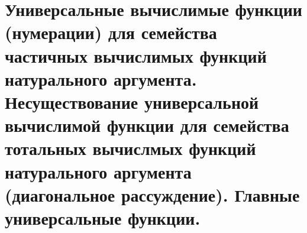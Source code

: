 \section{Универсальные вычислимые функции (нумерации) для семейства частичных вычислимых функций натурального аргумента. Несуществование универсальной вычислимой функции для семейства тотальных вычислмых функций натурального аргумента (диагональное рассуждение). Главные универсальные функции.}